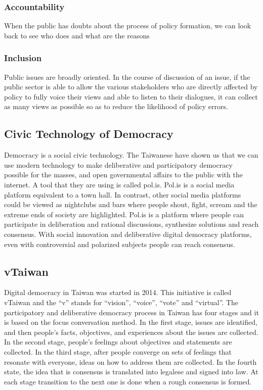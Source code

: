 \documentclass{IEEEtran}
\begin{document}
\subsubsection{Accountability}
When the public has doubts about the process of policy formation, we can look back to see who does and what are the reasons   
\subsubsection{Inclusion}
Public issues are broadly oriented. In the course of discussion of an issue, if the public sector is able to allow the various stakeholders who are directly affected by policy to fully voice their views and able to listen to their dialogues, it can collect as many views as possible so as to reduce the likelihood of policy errors. 


\subsection{Civic Technology of Democracy}
Democracy is a social civic technology. The Taiwanese have shown us that we can use modern technology to make deliberative and participatory democracy possible for the masses, and open governmental affairs to the public with the internet. A tool that they are using is called pol.is. Pol.is is a social media platform equivalent to a town hall. In contrast, other social media platforms could be viewed as nightclubs and bars where people shout, fight, scream and the extreme ends of society are highlighted. Pol.is is a platform where people can participate in deliberation and rational discussions, synthesize solutions and reach consensus.
With social innovation and deliberative digital democracy platforms, even with controversial and polarized subjects people can reach consensus.

\subsection{vTaiwan}
Digital democracy in Taiwan was started in 2014. This initiative is called vTaiwan and the “v” stands for “vision”, “voice”, “vote” and “virtual”. The participatory and deliberative democracy process in Taiwan has four stages and it is based on the focus conversation method. In the first stage, issues are identified, and then people’s facts, objectives, and experiences about the issues are collected. In the second stage, people's feelings about objectives and statements are collected. In the third stage, after people converge on sets of feelings that resonate with everyone, ideas on how to address them are collected. In the fourth state, the idea that is consensus is translated into legalese and signed into law. At each stage transition to the next one is done when a rough consensus is formed.
\end{document}

